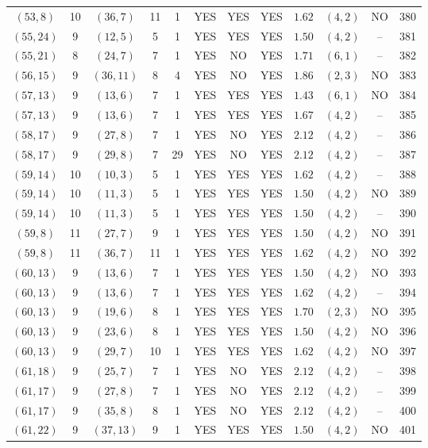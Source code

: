 \begin{longtable}{|c|c|c|c|c|c|c|c|c|c|c|c|}
$(53,8)$ & 10 & $(36,7)$ & 11 & 1 & YES & YES & YES & $1.62$ & $(4,2)$ & NO & 380\\
$(55,24)$ & 9 & $(12,5)$ & 5 & 1 & YES & YES & YES & $1.50$ & $(4,2)$ & -- & 381\\
$(55,21)$ & 8 & $(24,7)$ & 7 & 1 & YES & NO & YES & $1.71$ & $(6,1)$ & -- & 382\\
$(56,15)$ & 9 & $(36,11)$ & 8 & 4 & YES & NO & YES & $1.86$ & $(2,3)$ & NO & 383\\
$(57,13)$ & 9 & $(13,6)$ & 7 & 1 & YES & YES & YES & $1.43$ & $(6,1)$ & NO & 384\\
$(57,13)$ & 9 & $(13,6)$ & 7 & 1 & YES & YES & YES & $1.67$ & $(4,2)$ & -- & 385\\
$(58,17)$ & 9 & $(27,8)$ & 7 & 1 & YES & NO & YES & $2.12$ & $(4,2)$ & -- & 386\\
$(58,17)$ & 9 & $(29,8)$ & 7 & 29 & YES & NO & YES & $2.12$ & $(4,2)$ & -- & 387\\
$(59,14)$ & 10 & $(10,3)$ & 5 & 1 & YES & YES & YES & $1.62$ & $(4,2)$ & -- & 388\\
$(59,14)$ & 10 & $(11,3)$ & 5 & 1 & YES & YES & YES & $1.50$ & $(4,2)$ & NO & 389\\
$(59,14)$ & 10 & $(11,3)$ & 5 & 1 & YES & YES & YES & $1.50$ & $(4,2)$ & -- & 390\\
$(59,8)$ & 11 & $(27,7)$ & 9 & 1 & YES & YES & YES & $1.50$ & $(4,2)$ & NO & 391\\
$(59,8)$ & 11 & $(36,7)$ & 11 & 1 & YES & YES & YES & $1.62$ & $(4,2)$ & NO & 392\\
$(60,13)$ & 9 & $(13,6)$ & 7 & 1 & YES & YES & YES & $1.50$ & $(4,2)$ & NO & 393\\
$(60,13)$ & 9 & $(13,6)$ & 7 & 1 & YES & YES & YES & $1.62$ & $(4,2)$ & -- & 394\\
$(60,13)$ & 9 & $(19,6)$ & 8 & 1 & YES & YES & YES & $1.70$ & $(2,3)$ & NO & 395\\
$(60,13)$ & 9 & $(23,6)$ & 8 & 1 & YES & YES & YES & $1.50$ & $(4,2)$ & NO & 396\\
$(60,13)$ & 9 & $(29,7)$ & 10 & 1 & YES & YES & YES & $1.62$ & $(4,2)$ & NO & 397\\
$(61,18)$ & 9 & $(25,7)$ & 7 & 1 & YES & NO & YES & $2.12$ & $(4,2)$ & -- & 398\\
$(61,17)$ & 9 & $(27,8)$ & 7 & 1 & YES & NO & YES & $2.12$ & $(4,2)$ & -- & 399\\
$(61,17)$ & 9 & $(35,8)$ & 8 & 1 & YES & NO & YES & $2.12$ & $(4,2)$ & -- & 400\\
$(61,22)$ & 9 & $(37,13)$ & 9 & 1 & YES & YES & YES & $1.50$ & $(4,2)$ & NO & 401\\

\end{longtable}
